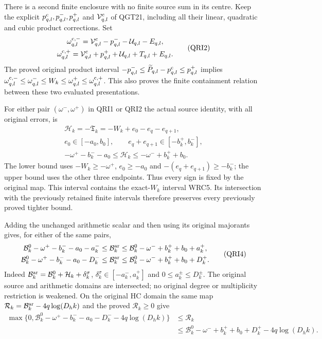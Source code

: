 There is a second finite enclosure with no finite source sum in
its centre. Keep the explicit $p^{\rm c}_{q,l},p^-_{q,l},p^+_{q,l}$
and $\mathcal V^{\rm c}_{q,l}$ of QGT21, including all their
linear, quadratic and cubic product corrections. Set
\[
\begin{gathered}
 \omega_{q,l}^{\rm c,-}=\mathcal V^{\rm c}_{q,l}
                    -p^-_{q,l}-\mathcal U_{q,l}-E_{q,l},\\
 \omega_{q,l}^{\rm c,+}=\mathcal V^{\rm c}_{q,l}
                    +p^+_{q,l}+\mathcal U_{q,l}+T_{q,l}+E_{q,l}.
\end{gathered}\tag{QRI2}
\]
The proved original product interval
$-p^-_{q,l}\le\widetilde P_{q,l}-p^{\rm c}_{q,l}\le p^+_{q,l}$
implies
$\omega_{q,l}^{\rm c,-}\le\omega_{q,l}^-\le W_k
 \le\omega_{q,l}^+\le\omega_{q,l}^{\rm c,+}$.
This also proves the finite containment relation between these
two evaluated presentations.

For either pair $(\omega^-,\omega^+)$ in QRI1 or QRI2 the actual
source identity, with all original errors, is
\[
\begin{gathered}
 \mathcal H_k=-\mathfrak T_k=-W_k+e_0-e_q-e_{q+1},\\
 e_0\in[-a_0,b_0],\qquad
 e_q+e_{q+1}\in[-b_k^+,b_k^-],\\
 -\omega^+-b_k^--a_0\le\mathcal H_k
                            \le-\omega^-+b_k^++b_0.
\end{gathered}\tag{QRI3}
\]
The lower bound uses $-W_k\ge-\omega^+$, $e_0\ge-a_0$ and
$-(e_q+e_{q+1})\ge-b_k^-$; the upper bound uses the other three
endpoints. Thus every sign is fixed by the original map. This
interval contains the exact-$W_k$ interval WRC5. Its intersection
with the previously retained finite intervals therefore preserves
every previously proved tighter bound.

Adding the unchanged arithmetic scalar and then using its original
majorants gives, for either of the same pairs,
\[
\begin{split}
 \mathcal B_k^0-\omega^+-b_k^--a_0-a_k^-
 &\le\mathcal B_k^{\rm ar}
 \le\mathcal B_k^0-\omega^-+b_k^++b_0+a_k^+,\\
 \mathcal B_k^0-\omega^+-b_k^--a_0-D_k^-
 &\le\mathcal B_k^{\rm ar}
 \le\mathcal B_k^0-\omega^-+b_k^++b_0+D_k^+.
\end{split}\tag{QRI4}
\]
Indeed $\mathcal B_k^{\rm ar}=\mathcal B_k^0+\mathcal H_k
+\delta_k^\sigma$, $\delta_k^\sigma\in[-a_k^-,a_k^+]$ and
$0\le a_k^\pm\le D_k^\pm$. The original source and arithmetic
domains are intersected; no original degree or multiplicity
restriction is weakened. On the original HC domain the same map
$\mathcal R_k=\mathcal B_k^{\rm ar}-4q\log(D_hk)$ and the
proved $\mathcal R_k\ge0$ give
\[
\begin{split}
 \max\{0,\mathcal B_k^0-\omega^+-b_k^--a_0-D_k^-
                              -4q\log(D_hk)\}
 &\le\mathcal R_k\\
 &\le\mathcal B_k^0-\omega^-+b_k^++b_0+D_k^+
                              -4q\log(D_hk).
\end{split}\tag{QRI5}
\]

